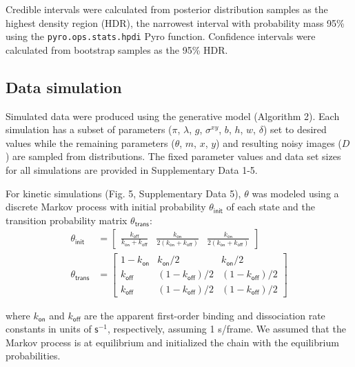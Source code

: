 Credible intervals were calculated from posterior distribution samples as the highest density region (HDR), the narrowest interval with probability mass 95\% using the \texttt{pyro.ops.stats.hpdi} Pyro function. Confidence intervals were calculated from bootstrap samples as the 95\% HDR.

\subsection*{Data simulation}

Simulated data were produced using the generative model (Algorithm 2). Each simulation has a subset of parameters ($\pi$, $\lambda$, $g$, $\sigma^{xy}$, $b$, $h$, $w$, $\delta$) set to desired values while  the remaining parameters ($\theta$, $m$, $x$, $y$) and resulting noisy images ($D$) are sampled from distributions. The fixed parameter values and data set sizes for all simulations are provided in Supplementary Data 1-5.

For kinetic simulations (Fig. 5, Supplementary Data 5), $\theta$ was modeled using a discrete Markov process with initial probability $\theta_\mathsf{init}$ of each state and the transition probability matrix $\theta_\mathsf{trans}$:
%
\begin{subequations}
\begin{align}
    \theta_\mathsf{init} &= \begin{bmatrix} \frac{k_\mathsf{off}}{k_\mathsf{on} + k_\mathsf{off}} & \frac{k_\mathsf{on}}{2\left( k_\mathsf{on} + k_\mathsf{off} \right)} & \frac{k_\mathsf{on}}{2\left( k_\mathsf{on} + k_\mathsf{off} \right)} \end{bmatrix} \\
    \theta_\mathsf{trans} &= \begin{bmatrix} 1 - k_\mathsf{on} & k_\mathsf{on}/2 & k_\mathsf{on}/2 \\ k_\mathsf{off} & (1 - k_\mathsf{off})/2 & (1 - k_\mathsf{off})/2 \\ k_\mathsf{off} & (1 - k_\mathsf{off})/2 & (1 - k_\mathsf{off})/2 \end{bmatrix}
\end{align}
\end{subequations}

\noindent
where $k_{\mathsf{on}}$ and $k_{\mathsf{off}}$ are the apparent first-order binding and dissociation rate constants in units of $\mathsf{s}^{-1}$, respectively, assuming 1 s/frame. We assumed that the Markov process is at equilibrium and initialized the chain with the equilibrium probabilities.

